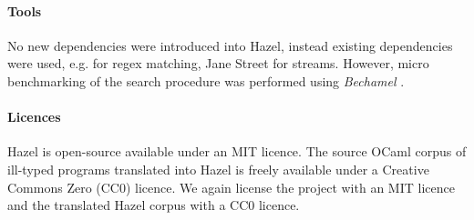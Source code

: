 \paragraph{Tools} No new dependencies were introduced into Hazel, instead existing dependencies were used, e.g.  \cite{JSOO} for regex matching, Jane Street  \cite{Base} for streams. However, micro benchmarking of the search procedure was performed using \textit{Bechamel} \cite{Bechamel}.

\paragraph{Licences} Hazel is open-source available under an MIT licence. The source OCaml corpus of ill-typed programs \cite{OCamlCorpus} translated into Hazel is freely available under a Creative Commons Zero (CC0) licence. We again license the project with an MIT licence and the translated Hazel corpus with a CC0 licence.
